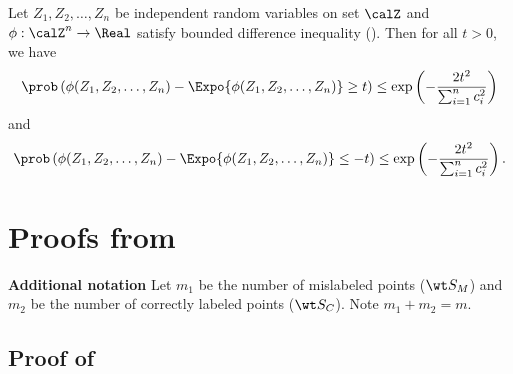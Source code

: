 \begin{lemma} \label{lem:McDiarmid} Let $Z_1, Z_2, \ldots, Z_n$ be independent random variables on set $\calZ$ and $\phi : \calZ^n \to \Real$ satisfy bounded difference inequality (). Then for all $t>0$, we have 
    \begin{align*}
        \prob\left( \phi(Z_1, Z_2, \ldots, Z_n) - \Expo{\phi(Z_1, Z_2, \ldots, Z_n)} \ge t \right) \le \exp{\left( -\frac{2t^2}{\sum_{i=1}^n c_i^2} \right) } 
    \end{align*} 
    and 
    \begin{align*}
        \prob\left( \phi(Z_1, Z_2, \ldots, Z_n) - \Expo{\phi(Z_1, Z_2, \ldots, Z_n)} \le -t \right) \le \exp{\left( -\frac{2t^2}{\sum_{i=1}^n c_i^2} \right) } \,.
    \end{align*} 
\end{lemma}


\section{Proofs from }\label{app:proof_erm}

\textbf{Additional notation {} {}} Let $m_1$ be the number of mislabeled points ($\wt S_M$) and $m_2$ be the number of correctly labeled points ($\wt S_C$). Note $m_1 + m_2 = m$. 


\subsection{Proof of }


